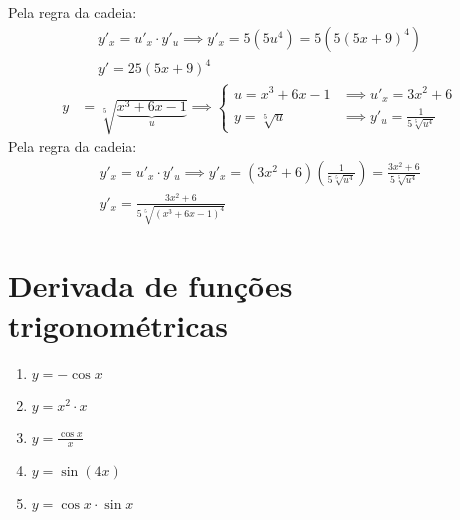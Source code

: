 \documentclass{jhwhw}
\begin{document}
Pela regra da cadeia:
\begin{multline*}
    y'^{}_x = u'^{}_x \cdot y'^{}_u \implies y'^{}_x = 5(5u^4) = 5(5(5x+9)^4)\\ \boxed{y' = 25 (5x+9)^4}
\end{multline*}
\begin{align*}
    y & = \sqrt[5]{\underbrace{x^3 + 6x - 1}_{u}} \implies
    \begin{cases}
        u = x^3 + 6x - 1 & \implies u'^{}_x = 3x^2 + 6                 \\
        y = \sqrt[5]{u}  & \implies y'^{}_u = \frac{1}{5\sqrt[5]{u^4}}
    \end{cases}
\end{align*}
Pela regra da cadeia:
\begin{multline*}
    y'^{}_x = u'^{}_x \cdot y'^{}_u \implies y'^{}_x = (3x^2+6)\left(\frac{1}{5\sqrt[5]{u^4}}\right)  = \frac{3x^2+6}{5\sqrt[5]{u^4}} \\  \boxed{y'^{}_x = \frac{3x^2+6}{5\sqrt[5]{(x^3 + 6x - 1)^4}}}
\end{multline*}
\newpage
\reset
\chapter{Derivada de funções trigonométricas}
\begin{enumerate}
    \item \(\displaystyle y = -\cos x\)
    \item \(\displaystyle y = x^2 \cdot x\)
    \item \(\displaystyle y = \frac{\cos x}{x}\)
    \item \(\displaystyle y = \sin (4x)\)
    \item \(\displaystyle y = \cos x \cdot \sin x\)
\end{enumerate}
\reset
\end{document}
